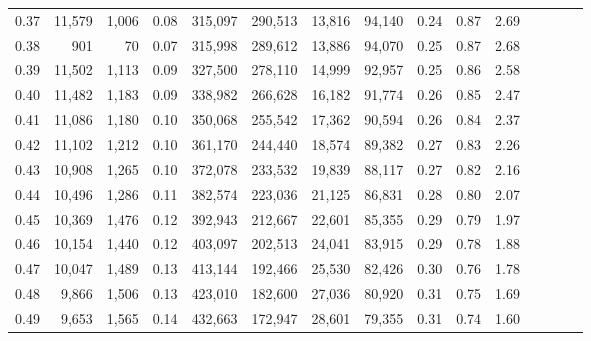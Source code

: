 \begin{tabular}{rrrcrrrrrrrrrrr}
0.37 &  11,579 &  1,006 &                                       0.08 &  315,097 &  290,513 &   13,816 &   94,140 &  0.24 &  0.87 &                         2.69 \\
0.38 &     901 &     70 &                                       0.07 &  315,998 &  289,612 &   13,886 &   94,070 &  0.25 &  0.87 &                         2.68 \\
0.39 &  11,502 &  1,113 &                                       0.09 &  327,500 &  278,110 &   14,999 &   92,957 &  0.25 &  0.86 &                         2.58 \\
0.40 &  11,482 &  1,183 &                                       0.09 &  338,982 &  266,628 &   16,182 &   91,774 &  0.26 &  0.85 &                         2.47 \\
0.41 &  11,086 &  1,180 &                                       0.10 &  350,068 &  255,542 &   17,362 &   90,594 &  0.26 &  0.84 &                         2.37 \\
0.42 &  11,102 &  1,212 &                                       0.10 &  361,170 &  244,440 &   18,574 &   89,382 &  0.27 &  0.83 &                         2.26 \\
0.43 &  10,908 &  1,265 &                                       0.10 &  372,078 &  233,532 &   19,839 &   88,117 &  0.27 &  0.82 &                         2.16 \\
0.44 &  10,496 &  1,286 &                                       0.11 &  382,574 &  223,036 &   21,125 &   86,831 &  0.28 &  0.80 &                         2.07 \\
0.45 &  10,369 &  1,476 &                                       0.12 &  392,943 &  212,667 &   22,601 &   85,355 &  0.29 &  0.79 &                         1.97 \\
0.46 &  10,154 &  1,440 &                                       0.12 &  403,097 &  202,513 &   24,041 &   83,915 &  0.29 &  0.78 &                         1.88 \\
0.47 &  10,047 &  1,489 &                                       0.13 &  413,144 &  192,466 &   25,530 &   82,426 &  0.30 &  0.76 &                         1.78 \\
0.48 &   9,866 &  1,506 &                                       0.13 &  423,010 &  182,600 &   27,036 &   80,920 &  0.31 &  0.75 &                         1.69 \\
0.49 &   9,653 &  1,565 &                                       0.14 &  432,663 &  172,947 &   28,601 &   79,355 &  0.31 &  0.74 &                         1.60 \\

\end{tabular}
